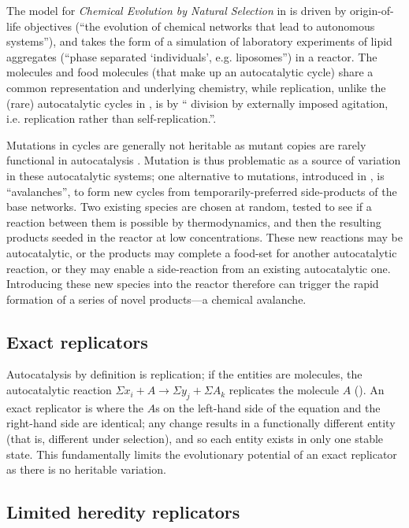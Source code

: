 The model for \emph{Chemical Evolution by Natural Selection} in \textcite{Fernando:2007pf, Fernando:2008xy} is driven by origin-of-life objectives (``the evolution of chemical networks that lead to autonomous systems''), and takes the form of a simulation of laboratory experiments of lipid aggregates (``phase separated ‘individuals’, e.g. liposomes'') in a reactor. The molecules and food molecules (that make up an autocatalytic cycle) share a common representation and underlying chemistry, while replication, unlike the (rare) autocatalytic cycles in \textcite{Faulconbridge2011}, is by `` division by externally imposed agitation, i.e. replication rather than self-replication.''.

Mutations in cycles are generally not heritable as mutant copies are rarely functional in autocatalysis \parencite{Vasas2012a}. Mutation is thus problematic as a source of variation in these autocatalytic systems; one alternative to mutations, introduced in \textcite{Fernando:2007pf},  is ``avalanches'', to form new cycles from temporarily-preferred side-products of the base networks. Two existing species are chosen at random, tested to see if a reaction between them is possible by thermodynamics, and then the resulting products seeded in the reactor at low concentrations. These new reactions may be autocatalytic, or the products may complete a food-set for another autocatalytic reaction, or they may enable a side-reaction from an existing autocatalytic one. Introducing these new species into the reactor therefore can trigger the rapid formation of a series of novel products---a chemical avalanche.

\subsection{Exact replicators}\label{non-informational-exact-replicators}

Autocatalysis by definition is replication; if the entities are molecules, the autocatalytic reaction $\Sigma x_i + A\rightarrow \Sigma y_j + \Sigma A_k$ replicates the molecule $A$ (\eg \textcite{Lifson1997}). An exact replicator is where the $A$s on the left-hand side of the equation and the right-hand side are identical; any change results in a functionally different entity (that is, different under selection), and so each entity exists in only one stable state. This fundamentally limits the evolutionary potential of an exact replicator as there is no heritable variation.

\subsection{Limited heredity replicators}\label{variable-replicators}

